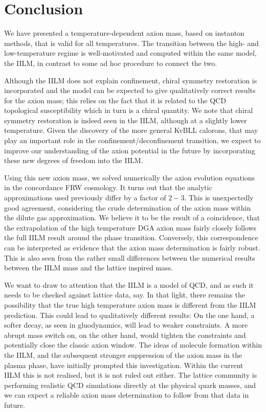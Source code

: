 \documentclass[preprint,nofootinbib]{revtex4}
\begin{document}
\section{Conclusion}

We have presented a temperature-dependent axion mass, based on instanton methods, that is valid for all temperatures. The transition between the high- and low-temperature regime is well-motivated and computed within the same model, the IILM, in contrast to some ad hoc procedure to connect the two.

Although the IILM does not explain confinement, chiral symmetry restoration is incorporated and the model can be expected to give qualitatively correct results for the axion mass; this relies on the fact that it is related to the QCD topological susceptibility which in turn is a chiral quantity. We note that chiral symmetry restoration is indeed seen in the IILM, although at a slightly lower temperature. Given the discovery of the more general KvBLL calorons, that may play an important role in the confinement/deconfinement transition, we expect to improve our understanding of the axion potential in the future by incorporating these new degrees of freedom into the IILM.

Using this new axion mass, we solved numerically the axion evolution equations in the concordance FRW cosmology. It turns out that the analytic approximations used previously differ by a factor of $2-3$. This is unexpectedly good agreement, considering the crude determination of the axion mass within the dilute gas approximation. We believe it to be the result of a coincidence, that the extrapolation of the high temperature DGA axion mass fairly closely follows the full IILM result around the phase transition. Conversely, this correspondence can be interpreted as evidence that the axion mass determination is fairly robust. This is also seen from the rather small differences between the numerical results between the IILM mass and the lattice inspired mass. 

We want to draw to attention that the IILM is a model of QCD, and as such it needs to be checked against lattice data, say. In that light, there remains the possibility that the true high temperature axion mass is different from the IILM prediction. This could lead to qualitatively different results: On the one hand, a softer decay, as seen in gluodynamics, will lead to weaker constraints. A more abrupt mass switch on, on the other hand, would tighten the constraints and potentially close the classic axion window. The ideas of molecule formation within the IILM, and the subsequent stronger suppression of the axion mass in the plasma phase, have initially prompted this investigation. Within the current IILM this is not realised, but it is not ruled out either. The lattice community is performing realistic QCD simulations directly at the physical quark masses, and we can expect a reliable axion mass determination to follow from that data in future.
\end{document}
